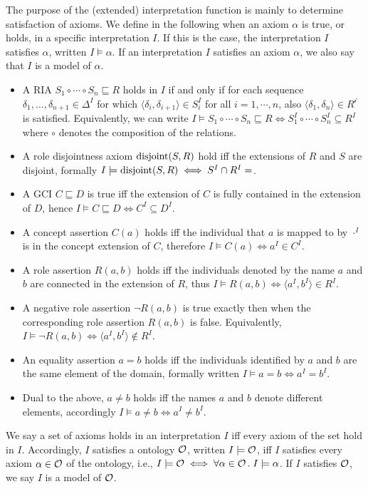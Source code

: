 The purpose of the (extended) interpretation function is mainly to determine satisfaction of axioms. We define in the following when an axiom $\alpha$ is true, or holds, in a specific interpretation $I$. If this is the case, the interpretation $I$ satisfies $\alpha$, written $I \models \alpha$. If an interpretation $I$ satisfies an axiom $\alpha$, we also say that $I$ is a model of $\alpha$.
\begin{itemize}
  \item A RIA $S_1 \circ \cdots \circ S_n \sqsubseteq R$ holds in $I$ if and only if for each sequence $\delta_1, \dots, \delta_{n + 1} \in \Delta^I$ for which $\langle \delta_i , \delta_{i + 1} \rangle \in S_i^I$ for all $i = 1, \cdots, n$, also $\langle \delta_1 , \delta_n \rangle \in R^\mathcal{i}$ is satisfied. Equivalently, we can write $I \models S_1 \circ \cdots \circ S_n \sqsubseteq R \iff S_1^I \circ \cdots \circ S_n^I \subseteq R^I$ where $\circ$ denotes the composition of the relations.
  \item A role disjointness axiom $\operatorname{disjoint}(S, R)$ hold iff the extensions of $R$ and $S$ are disjoint, formally $I \models \disjoint(S, R) \iff S^I \cap R^I = \empty$.
  \item A GCI $C \sqsubseteq D$ is true iff the extension of $C$ is fully contained in the extension of $D$, hence $I \models C \sqsubseteq D \iff C^I \subseteq D^I$.
  \item A concept assertion $C(a)$ holds iff the individual that $a$ is mapped to by $\cdot^I$ is in the concept extension of $C$, therefore $I \models C (a) \iff a^I \in C^I$.
  \item A role assertion $R(a, b)$ holds iff the individuals denoted by the name $a$ and $b$ are connected in the extension of $R$, thus $I \models R(a, b) \iff \langle a^I, b^I \rangle \in R^I$.
  \item A negative role assertion $\lnot R(a, b)$ is true exactly then when the corresponding role assertion $R(a, b)$ is false. Equivalently, $I \models \lnot R(a, b) \iff \langle a^I, b^I \rangle \not\in R^I$.
  \item An equality assertion $a = b$ holds iff the individuals identified by $a$ and $b$ are the same element of the domain, formally written $I \models a = b \iff a^I = b^I$.
  \item Dual to the above, $a \not = b$ holds iff the names $a$ and $b$ denote different elements, accordingly $I \models a \not= b \iff a^I \not= b^I$.
\end{itemize}
We say a set of axioms holds in an interpretation $I$ iff every axiom of the set hold in $I$. Accordingly, $I$ satisfies a ontology $\mathcal{O}$, written $I \models \mathcal{O}$, iff $I$ satisfies every axiom $\alpha \in \mathcal{O}$ of the ontology, i.e., $I \models \mathcal{O} \iff \forall \alpha \in \mathcal{O} \, . \; I \models \alpha$. If $I$ satisfies $\mathcal{O}$, we say $I$ is a model of $\mathcal{O}$.

